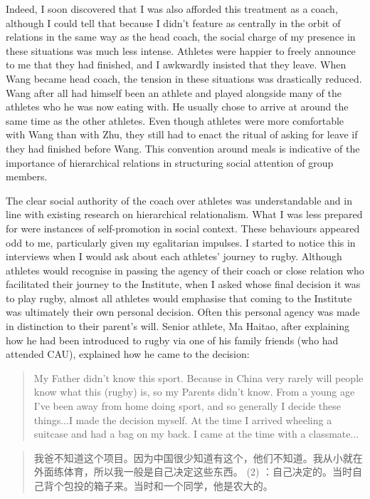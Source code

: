\begin{CJK}{UTF8}{gbsn}
Indeed, I soon discovered that I was also afforded this treatment as a coach, although I could tell that because I didn't feature as centrally in the orbit of relations in the same way as the head coach, the social charge of my presence in these situations was much less intense.  Athletes were happier to freely announce to me that they had finished, and I awkwardly insisted that they leave.  When Wang became head coach, the tension in these situations was drastically reduced. Wang after all had himself been an athlete and played alongside many of the athletes who he was now eating with.  He usually chose to arrive at around the same time as the other athletes.  Even though athletes were more comfortable with Wang than with Zhu, they still had to enact the ritual of asking for leave if they had finished before Wang.  This convention around meals is indicative of the importance of hierarchical relations in structuring social attention of group members.

The clear social authority of the coach over athletes was understandable and in line with existing research on hierarchical relationalism.  What I was less prepared for were instances of self-promotion in social context.  These behaviours appeared odd to me, particularly given my egalitarian impulses.  I started to notice this in interviews when I would ask about each athletes' journey to rugby.  Although athletes would recognise in passing the agency of their coach or close relation who facilitated their journey to the Institute, when I asked whose final decision it was to play rugby, almost all athletes would emphasise that coming to the Institute was ultimately their own personal decision.  Often this personal agency was made in distinction to their parent's will.  Senior athlete, Ma Haitao, after explaining how he had been introduced to rugby via one of his family friends (who had attended CAU), explained how he came to the decision:

  \begin{quotation}
    My Father didn't know this sport.  Because in China very rarely will people know what this (rugby) is, so my Parents didn't know. From a young age I've been away from home doing sport, and so generally I decide these things...I made the decision myself.  At the time I arrived wheeling a suitcase and had a bag on my back.  I came at the time with a classmate...
  \end{quotation}

  \begin{quotation}
    我爸不知道这个项目。因为中国很少知道有这个，他们不知道。我从小就在外面练体育，所以我一般是自己决定这些东西。 (2) ：自己决定的。当时自己背个包投的箱子来。当时和一个同学，他是农大的。
  \end{quotation}



\end{CJK}
